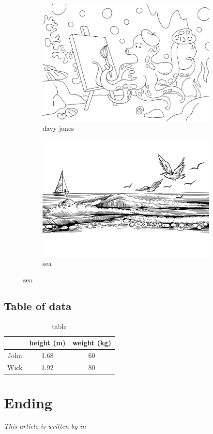 \documentclass{article}
\begin{document}
	\begin{figure}[ht]
		\centering
		\begin{subfigure}
			{0.45\textwidth}
			\centering
			\includegraphics[width=\textwidth]{rb_154283.png}
			\caption{davy jones}
			\label{davy jones}
		\end{subfigure}
		\begin{subfigure}
			{0.45\textwidth}
			\centering
			\includegraphics[width=\textwidth]{rb_28519.png}
			\caption{sea}
			\label{sea}
		\end{subfigure}
		\hfil
	\end{figure}
	\newpage
	\subsection{Table of data}
	\begin{table}[h]
		\centering
		\begin{tabular}{|c|c|c|}
			\hline
			     & height (m) & weight (kg) \\
			\hline
			John & 1.68       & 60          \\
			\hline
			Wick & 1.92       & 80          \\
			\hline
		\end{tabular}
		\caption{table}
		\label{table}
	\end{table}

	\section{Ending}
	\textit{This article is written by \textbf{\citeauthor{FinalArticle}} in \textbf{}}

	\printbibliography
\end{document}
